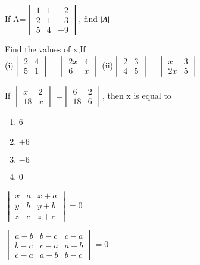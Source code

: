 \item If A=$\begin{vmatrix}1&1&-2\\2&1&-3\\5&4&-9\end{vmatrix}$, 
find $\left\vert A\right\vert$
\\
\solution 

\item Find the values of x,If\\
(i)$\begin{vmatrix}
2&4\\5&1
\end{vmatrix}$ =$\begin{vmatrix}
2x&4 \\ 6&x
\end{vmatrix}$
(ii)$\begin{vmatrix}
2&3 \\ 4&5
\end{vmatrix}$ =$\begin{vmatrix}
x&3 \\ 2x&5
\end{vmatrix}$
\\
\solution 

\item If  $\begin{vmatrix}
x&2 \\ 18&x
\end{vmatrix}$ =$\begin{vmatrix}
6&2 \\ 18&6
\end{vmatrix}$, then x is equal to 
\begin{enumerate}
\item 6
\item $\pm 6$
\item $-6$
\item 0
\end{enumerate}
\item $\begin{vmatrix}
x&a&x+a\\y&b&y+b\\z&c&z+c\end{vmatrix}=0$
\\
\solution 

\item $\begin{vmatrix}
a-b&b-c&c-a\\b-c&c-a&a-b\\c-a&a-b&b-c\end{vmatrix}=0$
